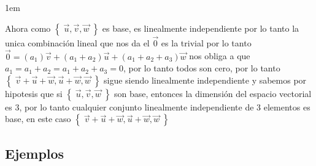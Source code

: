 \documentclass[12pt, fleqn]{report}                             %
\newenvironment{SmallIndentation}[1][0.75em]                    %
        {\begin{adjustwidth}{#1}{}\begin{footnotesize}}             %
        {\end{footnotesize}\end{adjustwidth}}                       %
\theoremstyle{break}                                            %
\newcommand{\Set}[1]    {\left\{ \; #1 \; \right\}}             %
\begin{document}
\begin{itemize}
\begin{SmallIndentation}[1em]
                            Ahora como $\Set{\vec u, \vec v, \vec w}$ es base, es linealmente independiente
                            por lo tanto la unica combinación lineal que nos da el $\vec 0$ es la trivial
                            por lo tanto $\vec 0 = (a_1)\vec v + (a_1 + a_2)\vec u  + (a_1 + a_2 + a_3)\vec w$
                            nos obliga a que $a_1 = a_1 + a_2 = a_1 + a_2 + a_3 = 0$, por lo tanto
                            todos son cero, por lo tanto $\Set{\vec v + \vec u + \vec w, \vec u + \vec w, \vec w}$
                            sigue siendo linealmente independiente y sabemos por hipotesis que si 
                            $\Set{\vec u, \vec v, \vec w}$ son base, entonces la dimensión del espacio vectorial
                            es 3, por lo tanto cualquier conjunto linealmente independiente de 3 elementos
                            es base, en este caso $\Set{\vec v + \vec u + \vec w, \vec u + \vec w, \vec w}$

                        \end{SmallIndentation}
                         

                \end{itemize}



            \clearpage
            \subsection{Ejemplos}
\end{document}
